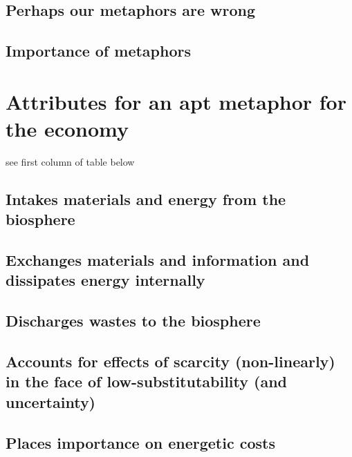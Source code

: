 \subsection{Perhaps our metaphors are wrong}
\label{sec:wrong_metaphors}


\subsection{Importance of metaphors}
\label{sec:importance_metaphors}

\section{Attributes for an apt metaphor for the economy}
\label{sec:metaphor_requirements}

see first column of table below

\subsection{Intakes materials and energy from the biosphere}
\label{sec:inputs}

\subsection{Exchanges materials and information and dissipates energy internally}
\label{sec:internal_exchange}

\subsection{Discharges wastes to the biosphere}
\label{sec:discharges_waste}

\subsection{Accounts for effects of scarcity (non-linearly) in the face of low-substitutability (and uncertainty)}
\label{sec:accounts_for_scarcity}

\subsection{Places importance on energetic costs}
\label{sec:importance_of_energy}

